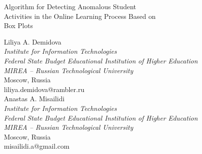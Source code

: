 \documentclass{article}
\begin{document}
  \begin{Center}
    {\myfont Algorithm for Detecting Anomalous Student\\Activities in the Online Learning Process Based on\\Box Plots\\}
  \end{Center}
  \bigbreak
\begin{multicols}{2}
  \begin{justify}
    \begin{Center}
      \begin{small}
        Liliya A. Demidova\\
        \textit{
          Institute for Information Technologies\\
          Federal State Budget Educational Institution of Higher Education\\\guillemotleft MIREA – Russian Technological University\guillemotright\\
        }
        Moscow, Russia\\
        liliya.demidova@rambler.ru\\
        Anastas A. Misailidi\\
        \textit{
          Institute for Information Technologies\\
          Federal State Budget Educational Institution of Higher Education\\\guillemotleft MIREA – Russian Technological University\guillemotright\\
        }
        Moscow, Russia\\
        misailidi.a@gmail.com\\
      \end{small}
    \end{Center}
  \end{justify}
\end{multicols}
\bigbreak
\end{document}
